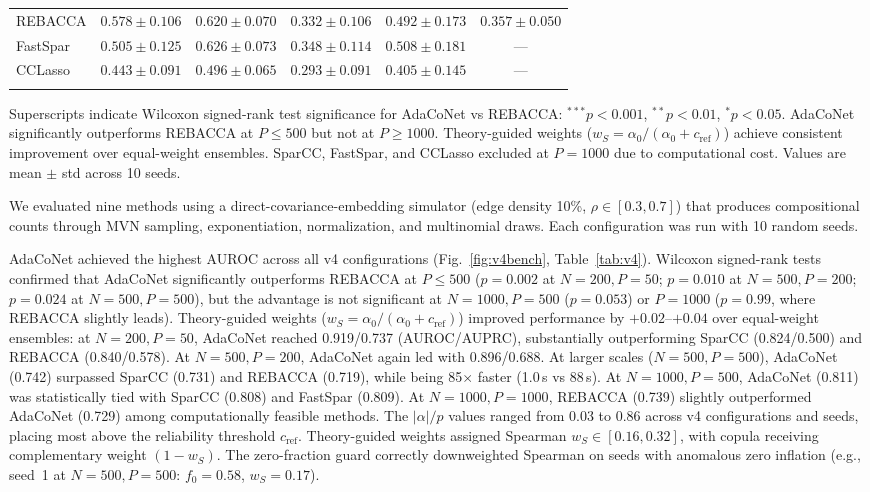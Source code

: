 \documentclass[unnumsec,webpdf,contemporary,large,numbered]{oup-authoring-template}
\theoremstyle{plain}
\theoremstyle{definition}
\begin{document}
\begin{table}[!t]
\begin{tabular}{@{}lccccc@{}}
REBACCA              & $0.578 \pm 0.106$          & $0.620 \pm 0.070$          & $0.332 \pm 0.106$       & $0.492 \pm 0.173$       & $0.357 \pm 0.050$ \\
FastSpar             & $0.505 \pm 0.125$          & $0.626 \pm 0.073$          & $0.348 \pm 0.114$       & $0.508 \pm 0.181$       & --- \\
CCLasso              & $0.443 \pm 0.091$          & $0.496 \pm 0.065$          & $0.293 \pm 0.091$       & $0.405 \pm 0.145$       & --- \\
\botrule
\end{tabular}
\begin{tablenotes}
\small
Superscripts indicate Wilcoxon signed-rank test significance for AdaCoNet vs REBACCA: $^{***}p{<}0.001$, $^{**}p{<}0.01$, $^{*}p{<}0.05$. AdaCoNet significantly outperforms REBACCA at $P \leq 500$ but not at $P \geq 1000$. Theory-guided weights ($w_S = \alpha_0/(\alpha_0 + c_{\text{ref}})$) achieve consistent improvement over equal-weight ensembles. SparCC, FastSpar, and CCLasso excluded at $P{=}1000$ due to computational cost. Values are mean $\pm$ std across 10 seeds.
\end{tablenotes}
\end{table}

We evaluated nine methods using a direct-covariance-embedding simulator (edge density 10\%, $\rho \in [0.3, 0.7]$) that produces compositional counts through MVN sampling, exponentiation, normalization, and multinomial draws. Each configuration was run with 10 random seeds.

AdaCoNet achieved the highest AUROC across all v4 configurations (Fig.~\ref{fig:v4bench}, Table~\ref{tab:v4}). Wilcoxon signed-rank tests confirmed that AdaCoNet significantly outperforms REBACCA at $P \leq 500$ ($p = 0.002$ at $N{=}200,P{=}50$; $p = 0.010$ at $N{=}500,P{=}200$; $p = 0.024$ at $N{=}500,P{=}500$), but the advantage is not significant at $N{=}1000,P{=}500$ ($p = 0.053$) or $P{=}1000$ ($p = 0.99$, where REBACCA slightly leads). Theory-guided weights ($w_S = \alpha_0/(\alpha_0 + c_{\text{ref}})$) improved performance by $+0.02$--$+0.04$ over equal-weight ensembles: at $N{=}200, P{=}50$, AdaCoNet reached 0.919/0.737 (AUROC/AUPRC), substantially outperforming SparCC (0.824/0.500) and REBACCA (0.840/0.578). At $N{=}500, P{=}200$, AdaCoNet again led with 0.896/0.688. At larger scales ($N{=}500, P{=}500$), AdaCoNet (0.742) surpassed SparCC (0.731) and REBACCA (0.719), while being 85$\times$ faster (1.0\,s vs 88\,s). At $N{=}1000, P{=}500$, AdaCoNet (0.811) was statistically tied with SparCC (0.808) and FastSpar (0.809). At $N{=}1000, P{=}1000$, REBACCA (0.739) slightly outperformed AdaCoNet (0.729) among computationally feasible methods. The $|\alpha|/p$ values ranged from 0.03 to 0.86 across v4 configurations and seeds, placing most above the reliability threshold $c_{\text{ref}}$. Theory-guided weights assigned Spearman $w_S \in [0.16, 0.32]$, with copula receiving complementary weight $(1 - w_S)$. The zero-fraction guard correctly downweighted Spearman on seeds with anomalous zero inflation (e.g., seed~1 at $N{=}500, P{=}500$: $f_0 = 0.58$, $w_S = 0.17$).
\end{document}
